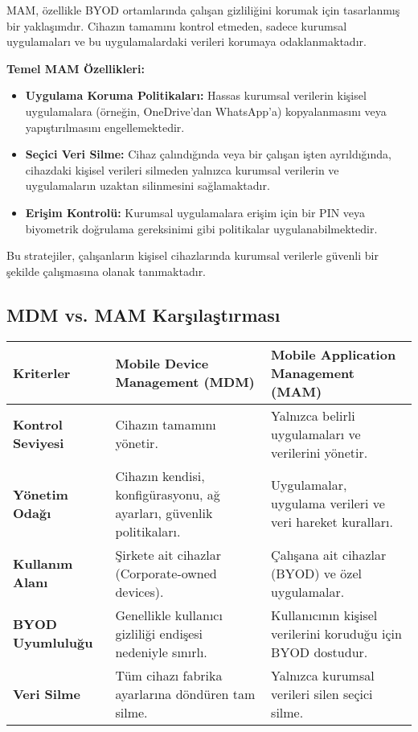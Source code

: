 MAM, özellikle BYOD ortamlarında çalışan gizliliğini korumak için tasarlanmış bir yaklaşımdır. Cihazın tamamını kontrol etmeden, sadece kurumsal uygulamaları ve bu uygulamalardaki verileri korumaya odaklanmaktadır.

\textbf{Temel MAM Özellikleri:}
\begin{itemize}
    \item \textbf{Uygulama Koruma Politikaları:} Hassas kurumsal verilerin kişisel uygulamalara (örneğin, OneDrive'dan WhatsApp'a) kopyalanmasını veya yapıştırılmasını engellemektedir.
    \item \textbf{Seçici Veri Silme:} Cihaz çalındığında veya bir çalışan işten ayrıldığında, cihazdaki kişisel verileri silmeden yalnızca kurumsal verilerin ve uygulamaların uzaktan silinmesini sağlamaktadır.
    \item \textbf{Erişim Kontrolü:} Kurumsal uygulamalara erişim için bir PIN veya biyometrik doğrulama gereksinimi gibi politikalar uygulanabilmektedir.
\end{itemize}

Bu stratejiler, çalışanların kişisel cihazlarında kurumsal verilerle güvenli bir şekilde çalışmasına olanak tanımaktadır.

\subsection{MDM vs. MAM Karşılaştırması}

\begin{longtable}{|p{4.5cm}|p{4.5cm}|p{4.5cm}|}
\hline
\textbf{Kriterler} & \textbf{Mobile Device Management (MDM)} & \textbf{Mobile Application Management (MAM)} \\
\hline
\textbf{Kontrol Seviyesi} & Cihazın tamamını yönetir. & Yalnızca belirli uygulamaları ve verilerini yönetir. \\
\hline
\textbf{Yönetim Odağı} & Cihazın kendisi, konfigürasyonu, ağ ayarları, güvenlik politikaları. & Uygulamalar, uygulama verileri ve veri hareket kuralları. \\
\hline
\textbf{Kullanım Alanı} & Şirkete ait cihazlar (Corporate-owned devices). & Çalışana ait cihazlar (BYOD) ve özel uygulamalar. \\
\hline
\textbf{BYOD Uyumluluğu} & Genellikle kullanıcı gizliliği endişesi nedeniyle sınırlı. & Kullanıcının kişisel verilerini koruduğu için BYOD dostudur. \\
\hline
\textbf{Veri Silme} & Tüm cihazı fabrika ayarlarına döndüren tam silme. & Yalnızca kurumsal verileri silen seçici silme. \\
\hline
\end{longtable}

